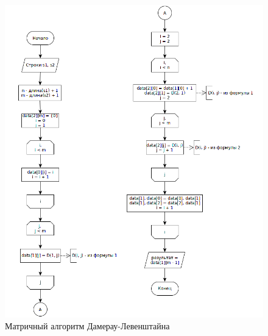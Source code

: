 \begin{figure}[H]
\centering
\includegraphics[scale=0.5]{trans}
\caption{Матричный алгоритм Дамерау-Левенштайна}
\end{figure}

